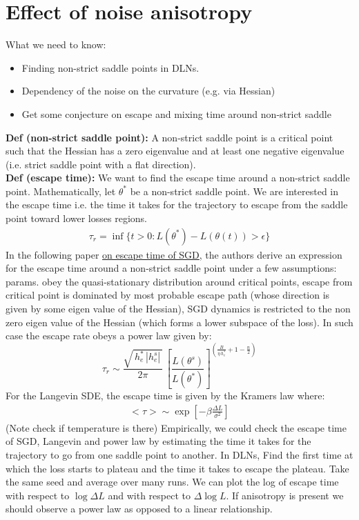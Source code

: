 \documentclass[11pt]{article}
\begin{document}
\section{Effect of noise anisotropy}
What we need to know:
\begin{itemize}
    \item Finding non-strict saddle points in DLNs.
    \item Dependency of the noise on the curvature (e.g. via Hessian)
    \item Get some conjecture on escape and mixing time around non-strict saddle
\end{itemize}
\textbf{Def (non-strict saddle point):} A non-strict saddle point is a critical point such that the Hessian has a zero eigenvalue and at least one negative eigenvalue (i.e. strict saddle point with a flat direction).
\\
\textbf{Def (escape time):} We want to find the escape time around a non-strict saddle point. Mathematically, let $\theta^*$ be a non-strict saddle point. We are interested in the escape time i.e. the time it takes for the trajectory to escape from the saddle point toward lower losses regions.
\begin{align}
    \tau_r = \inf\{t > 0: L(\theta^*) - L(\theta(t)) > \epsilon\}
\end{align}
In the following paper \href{https://arxiv.org/pdf/2105.09557#page=5.74}{on escape time of SGD}, the authors derive an expression for the escape time around a non-strict saddle point under a few assumptions: params. obey the quasi-stationary distribution around critical points, escape from critical point is dominated by most probable escape path (whose direction is given by some eigen value of the Hessian), SGD dynamics is restricted to the non zero eigen value of the Hessian (which forms a lower subspace of the loss). In such case the escape rate obeys a power law given by:
\[
\tau_r \sim 
\frac{\sqrt{\,h_e^{*}\,|h_e^{s}|\,}}{2\pi}\,
\left[\frac{L(\theta^{s})}{L(\theta^{*})}\right]^{
\left(\frac{B}{\eta\,h_e^{*}} + 1 - \frac{n}{2}\right)}
\]
For the Langevin SDE, the escape time is given by the Kramers law where:
\begin{align}
    <\tau> \sim \exp[-\beta\frac{\Delta L}{\sigma^2}]
\end{align}
(Note check if temperature is there)
Empirically, we could check the escape time of SGD, Langevin and power law by estimating the time it takes for the trajectory to go from one saddle point to another. In DLNs, Find the first time at which the loss starts to plateau and the time it takes to escape the plateau. Take the same seed and average over many runs. We can plot the log of escape time with respect to $\log\Delta L$ and with respect to $\Delta \log L$. If anisotropy is present we should observe a power law as opposed to a linear relationship.
\end{document}
